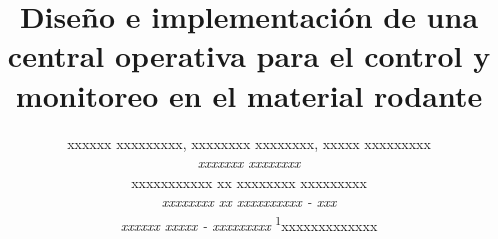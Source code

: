\documentclass[a4paper]{IEEEtran}
\begin{document}
\title{Diseño e implementación de una central operativa para el control y monitoreo en el material rodante}


\author{

xxxxxx xxxxxxxxx, 
xxxxxxxx xxxxxxxx, 
xxxxx xxxxxxxxx \\

\normalsize \textit{xxxxxxx xxxxxxxx} \\
xxxxxxxxxxx xx xxxxxxxx xxxxxxxxx \\
\textit{xxxxxxxx xx xxxxxxxxxx - xxx} \\
\textit{xxxxxx xxxxx - xxxxxxxxx}
\textsuperscript{1}\small xxxxxxxxxxxxx \\

}


\maketitle











% 
\end{document}
